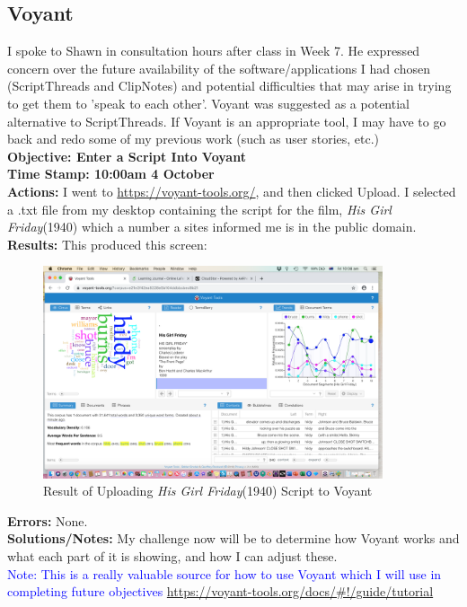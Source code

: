 \documentclass{article}
\begin{document}
\begin{FlushLeft}
\subsection{Voyant}
I spoke to Shawn in consultation hours after class in Week 7. He expressed concern over the future availability of the software/applications I had chosen (ScriptThreads and ClipNotes) and potential difficulties that may arise in trying to get them to 'speak to each other'. Voyant was suggested as a potential alternative to ScriptThreads. If Voyant is an appropriate tool, I may have to go back and redo some of my previous work (such as user stories, etc.)\\
\vspace{5mm}
\textbf{Objective: Enter a Script Into Voyant}\\ 
\textbf{Time Stamp: 10:00am 4 October} \\
\textbf{Actions:} I went to \url{https://voyant-tools.org/}, and then clicked Upload. I selected a .txt file from my desktop containing the script for the film, \textit{His Girl Friday}(1940) which a number a sites informed me is in the public domain. \\
\textbf{Results:} This produced this screen:\\
\begin{figure}[htp]
    \centering
    \includegraphics[width=10cm]{Voyant_Result.png}
    \caption{Result of Uploading \textit{His Girl Friday}(1940) Script to Voyant}
\end{figure}
\textbf{Errors:} None.\\
\textbf{Solutions/Notes:} My challenge now will be to determine how Voyant works and what each part of it is showing, and how I can adjust these.\\
\vspace{5mm}
\textcolor{blue}{Note: This is a really valuable source for how to use Voyant which I will use in completing future objectives} \url{https://voyant-tools.org/docs/#!/guide/tutorial}\\

\end{FlushLeft}
\end{document}
